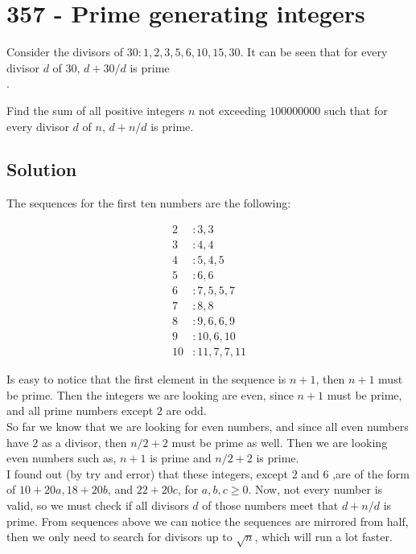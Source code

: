 \chapter*{357 - Prime generating integers}

Consider the divisors of $30: 1,2,3,5,6,10,15,30$.
It can be seen that for every divisor $d$ of $30$, $d+30/d$ is prime\\.

Find the sum of all positive integers $n$ not exceeding $100000000$
such that for every divisor $d$ of $n$, $d+n/d$ is prime.

\section*{Solution}

The sequences for the first ten numbers are the following:

\begin{align*}
    2 &: 3,3\\
    3 &: 4,4\\
    4 &: 5,4,5\\
    5 &: 6,6\\
    6 &: 7,5,5,7\\
    7 &: 8,8\\
    8 &: 9,6,6,9\\
    9 &: 10,6,10\\
    10 &: 11,7,7,11
\end{align*}

Is easy to notice that the first element in the sequence is $n+1$, then $n+1$ must be prime. Then the integers we are looking are even, since $n+1$ must be prime, and all prime numbers except $2$ are odd.\\

So far we know that we are looking for even numbers, and since all even numbers have $2$ as a divisor, then $n/2+2$ must be prime as well. Then we are looking even numbers such as, $n+1$ is prime and $n/2 + 2$ is prime.\\

I found out (by try and error) that these integers, except $2$ and $6$ ,are of the form of $10 + 20a, 18+20b$, and $22+20c$, for $a,b,c \geq 0$.  Now, not every number is valid, so we must check if all divisors $d$ of those numbers meet that $d + n/d$ is prime. From sequences above we can notice the sequences are mirrored from half, then we only need to search for divisors up to $\sqrt{n}$, which will run a lot faster.   